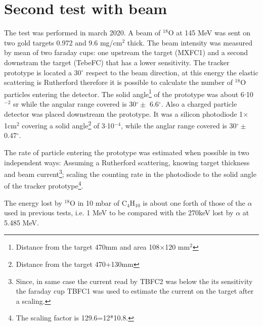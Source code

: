 \documentclass[a4paper, 11 pt]{report}
\newcommand{\ibeam}{$I_{beam}$}
\begin{document}
%
%

\clearpage
\section{Second test with beam} 

The test was performed in march 2020.
A beam of $^{18}$O at 145 MeV was sent on two gold targets 0.972 and 9.6 mg/cm$^2$ thick.
The beam intensity was measured by mean of two faraday cups: one upstream the target
(MXFC1) and a second downstram the target (TebeFC) that has a lower sensitivity.
The tracker prototype is located a 30$^{\circ}$ respect to the beam direction, at this energy 
the elastic scattering is Rutherford therefore it is possible to calculate the number of 
$^{18}$O particles entering the detector.
The solid angle\footnote{Distance from the target 470mm and area 108$\times$120 mm$^2$} of the 
prototype was about 6$\cdot$10$^{-2}$ sr while the angular range covered is 30$^{\circ} \pm$ 
6.6$^{\circ}$. Also a charged particle detector was placed downstream the 
prototype. It was a silicon photodiode 1$\times$1cm$^2$ covering a solid angle\footnote{Distance 
from the target 470+130mm} of 3$\cdot$10$^{-4}$, while the anglar range covered is 30$^{\circ} \pm$ 0.47$^{\circ}$.

The rate of particle entering the prototype was estimated when possible in two independent
ways: Assuming a Rutherford scattering, knowing target thickness and beam current\footnote{Since,
in same case the current read by TBFC2 was below the its sensitivity the faraday cup 
TBFC1 was used to estimate the current on the target after a scaling.}; 
scaling the counting rate in the photodiode to the solid angle of the tracker 
prototype\footnote{The scaling factor is 129.6=12*10.8.}.

The energy lost by $^{18}$O in 10 mbar of C$_4$H$_{10}$ is about one forth of those of the
$\alpha$ used in previous tests, i.e. 1 MeV to be compared with the 270keV lost by $\alpha$
at 5.485 MeV.
\end{document}
